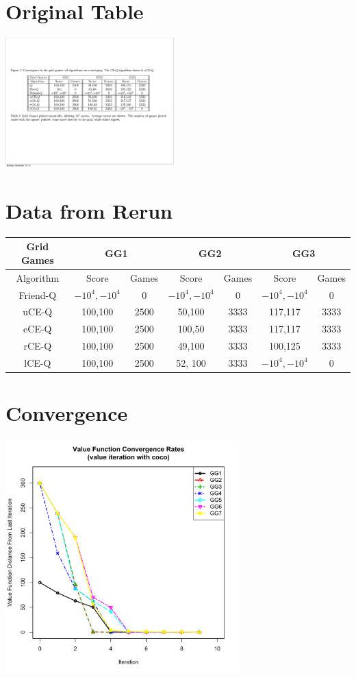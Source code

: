 \section{Original Table}
\includegraphics[height=50mm]{text/pic_CEQ.pdf}


\section{Data from Rerun}
\begin{tabular}{||c||c|c||c|c||c|c||}
	\hline
	Grid Games&  \multicolumn{2}{|c||}{GG1} &
	 \multicolumn{2}{|c||}{GG2}  & \multicolumn{2}{|c||}{GG3}  \\ \hline
	Algorithm & Score & Games & Score & Games & Score & Games \\ \hline \hline
	Friend-Q & $-10^{4},-10^{4}$ & 0 & $-10^{4},-10^{4}$ & 0 & $-10^{4},-10^{4}$ & 0 \\ \hline \hline
	uCE-Q & 100,100 & 2500 & 50,100 & 3333 & 117,117 & 3333 \\ \hline
	eCE-Q & 100,100 & 2500 & 100,50 & 3333 & 117,117 & 3333 \\ \hline
	rCE-Q & 100,100 & 2500 & 49,100 & 3333 & 100,125 & 3333 \\ \hline \hline
	lCE-Q & 100,100 & 2500 & 52, 100 & 3333 & $-10^{4},-10^{4}$ & 0 \\ \hline 
	
\end{tabular}

\section{Convergence}
\includegraphics[height=90mm]{text/plot.pdf}

